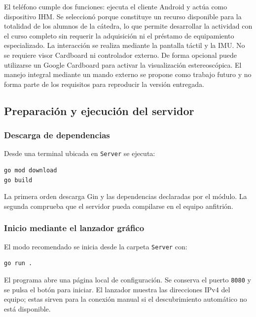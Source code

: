 El teléfono cumple dos funciones: ejecuta el cliente Android y actúa como dispositivo
IHM. Se seleccionó porque constituye un recurso disponible para la totalidad de los
alumnos de la cátedra, lo que permite desarrollar la actividad con el curso completo
sin requerir la adquisición ni el préstamo de equipamiento especializado. La
interacción se realiza mediante la pantalla táctil y la IMU. No se requiere visor
Cardboard ni controlador externo. De forma
opcional puede utilizarse un Google Cardboard para activar la visualización
estereoscópica. El manejo integral mediante un mando externo se propone como trabajo
futuro y no forma parte de los requisitos para reproducir la versión entregada.

\newpage
\thispagestyle{fancy}
\subsection{Preparación y ejecución del servidor}

\subsubsection{Descarga de dependencias}

Desde una terminal ubicada en \texttt{Server} se ejecuta:

\begin{lstlisting}[basicstyle=\ttfamily\footnotesize, frame=single, numbers=none,
caption={Preparación del servidor Go.}]
go mod download
go build
\end{lstlisting}

La primera orden descarga Gin y las dependencias declaradas por el módulo. La segunda
comprueba que el servidor pueda compilarse en el equipo anfitrión.

\subsubsection{Inicio mediante el lanzador gráfico}

El modo recomendado se inicia desde la carpeta \texttt{Server} con:

\begin{lstlisting}[basicstyle=\ttfamily\footnotesize, frame=single, numbers=none,
caption={Inicio mediante el lanzador.}]
go run .
\end{lstlisting}

El programa abre una página local de configuración. Se conserva el puerto
\texttt{8080} y se pulsa el botón para iniciar. El lanzador muestra las direcciones IPv4
del equipo; estas sirven para la conexión manual si el descubrimiento automático no
está disponible.

